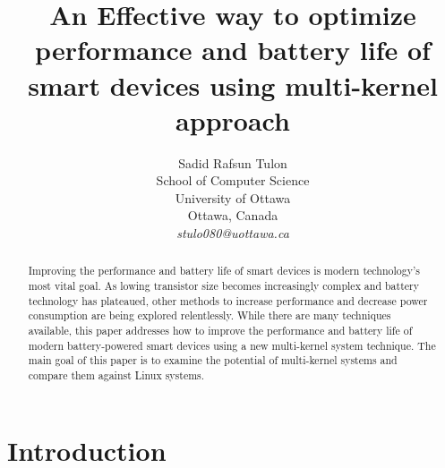 \documentclass[11pt]{article}       %
\begin{document}


\title{An Effective way to optimize performance and battery life of smart devices using multi-kernel approach}


\author{
Sadid Rafsun Tulon\\
School of Computer Science\\
University of Ottawa\\
Ottawa, Canada\\
{\em stulo080@uottawa.ca}
} %

\maketitle

\begin{abstract}
Improving the performance and battery life of smart devices is modern technology's most vital goal. As lowing transistor size becomes increasingly complex and battery technology has plateaued, other methods to increase performance and decrease power consumption are being explored relentlessly. While there are many techniques available, this paper addresses how to improve the performance and battery life of modern battery-powered smart devices using a new multi-kernel system technique. The main goal of this paper is to examine the potential of multi-kernel systems and compare them against Linux systems.
\end{abstract}

\section{Introduction} \label{intro}
\end{document}
